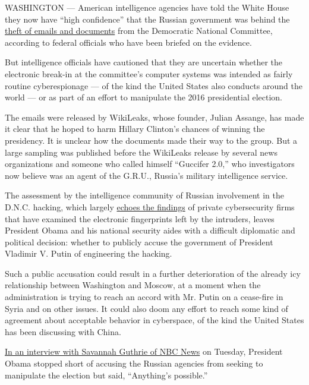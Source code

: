 WASHINGTON --- American intelligence agencies have told the White House
they now have ``high confidence'' that the Russian government was behind
the
\href{https://www.nytimes.com/2016/07/26/us/politics/democrats-allege-dnc-hack-is-part-of-russian-effort-to-elect-donald-trump.html}{theft
of emails and documents} from the Democratic National Committee,
according to federal officials who have been briefed on the evidence.

But intelligence officials have cautioned that they are uncertain
whether the electronic break-in at the committee's computer systems was
intended as fairly routine cyberespionage --- of the kind the United
States also conducts around the world --- or as part of an effort to
manipulate the 2016 presidential election.

The emails were released by WikiLeaks, whose founder, Julian Assange,
has made it clear that he hoped to harm Hillary Clinton's chances of
winning the presidency. It is unclear how the documents made their way
to the group. But a large sampling was published before the WikiLeaks
release by several news organizations and someone who called himself
``Guccifer 2.0,'' who investigators now believe was an agent of the
G.R.U., Russia's military intelligence service.

The assessment by the intelligence community of Russian involvement in
the D.N.C. hacking, which largely
\href{https://www.nytimes.com/2016/06/15/us/politics/russian-hackers-dnc-trump.html}{echoes
the findings} of private cybersecurity firms that have examined the
electronic fingerprints left by the intruders, leaves President Obama
and his national security aides with a difficult diplomatic and
political decision: whether to publicly accuse the government of
President Vladimir V. Putin of engineering the hacking.

Such a public accusation could result in a further deterioration of the
already icy relationship between Washington and Moscow, at a moment when
the administration is trying to reach an accord with Mr. Putin on a
cease-fire in Syria and on other issues. It could also doom any effort
to reach some kind of agreement about acceptable behavior in cyberspace,
of the kind the United States has been discussing with China.

\href{http://www.nbcnews.com/nightly-news/video/president-obama-on-russian-dnc-hack-involvement-anything-s-possible-732675139636}{In
an interview with Savannah Guthrie of NBC News} on Tuesday, President
Obama stopped short of accusing the Russian agencies from seeking to
manipulate the election but said, ``Anything's possible.''

